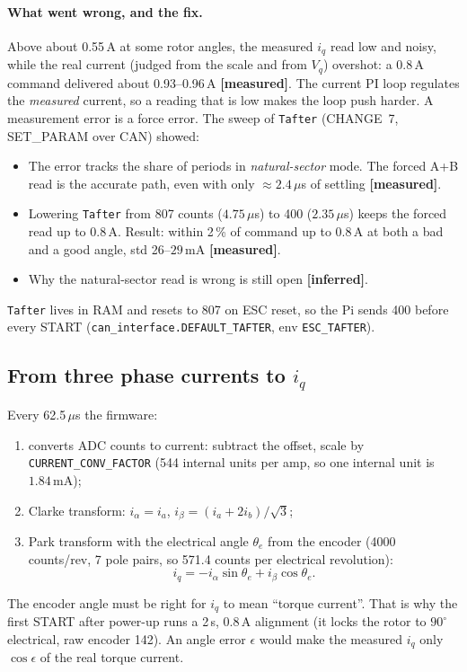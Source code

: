\documentclass[11pt,a4paper]{article}
\newcommand{\iq}{i_q}
\newcommand{\mA}{\,\mathrm{mA}}
\newcommand{\file}[1]{\texttt{#1}}
\newcommand{\measured}{\textcolor{teal!70!black}{\textbf{[measured]}}}
\newcommand{\inferred}{\textcolor{orange!80!black}{\textbf{[inferred]}}}
\begin{document}
\paragraph{What went wrong, and the fix.} Above about 0.55\,A at some
rotor angles, the measured $\iq$ read low and noisy, while the real
current (judged from the scale and from $V_q$) overshot: a 0.8\,A command
delivered about 0.93--0.96\,A \measured. The current PI loop regulates the
\emph{measured} current, so a reading that is low makes the loop push
harder. A measurement error is a force error. The sweep of \texttt{Tafter}
(CHANGE~7, SET\_PARAM over CAN) showed:
\begin{itemize}
  \item The error tracks the share of periods in \emph{natural-sector}
        mode. The forced A+B read is the accurate path, even with only
        $\approx 2.4\,\mu$s of settling \measured.
  \item Lowering \texttt{Tafter} from 807 counts ($4.75\,\mu$s) to 400
        ($2.35\,\mu$s) keeps the forced read up to 0.8\,A. Result: within
        2\,\% of command up to 0.8\,A at both a bad and a good angle, std
        26--$29\mA$ \measured.
  \item Why the natural-sector read is wrong is still open \inferred.
\end{itemize}
\texttt{Tafter} lives in RAM and resets to 807 on ESC reset, so the Pi
sends 400 before every START (\file{can\_interface.DEFAULT\_TAFTER}, env
\file{ESC\_TAFTER}).

\subsection{From three phase currents to $\iq$}
\label{sec:park}

Every 62.5\,$\mu$s the firmware:
\begin{enumerate}
  \item converts ADC counts to current: subtract the offset, scale by
        \file{CURRENT\_CONV\_FACTOR} (544 internal units per amp, so one
        internal unit is $1.84\mA$);
  \item Clarke transform: $i_\alpha = i_a$,\quad
        $i_\beta = (i_a + 2 i_b)/\sqrt3$;
  \item Park transform with the electrical angle $\theta_e$ from the
        encoder (4000 counts/rev, 7 pole pairs, so 571.4 counts per
        electrical revolution):
        \begin{equation}
          \iq = -i_\alpha\sin\theta_e + i_\beta\cos\theta_e .
        \end{equation}
\end{enumerate}
The encoder angle must be right for $\iq$ to mean ``torque current''.
That is why the first START after power-up runs a 2\,s, 0.8\,A alignment
(it locks the rotor to $90^\circ$ electrical, raw encoder 142). An angle
error $\epsilon$ would make the measured $\iq$ only $\cos\epsilon$ of the
real torque current.
\end{document}
